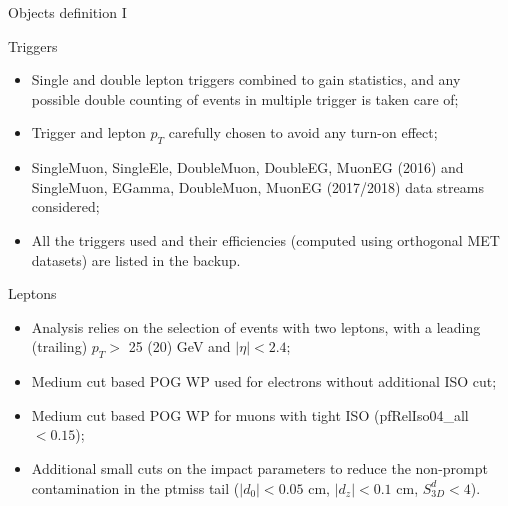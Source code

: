 \documentclass[8pt]{beamer}
\begin{document}
\begin{frame}{Objects definition I}
\justifying

\vspace{5pt} \begin{block}{\centering Triggers}\end{block} \vspace{-6pt}
\begin{itemize}
\justifying
\item \alert{Single and double lepton triggers} combined to gain statistics, and any possible double counting of events in multiple trigger is taken care of;
\item Trigger and lepton $p_T$ carefully chosen to avoid any turn-on effect;
\item SingleMuon, SingleEle, DoubleMuon, DoubleEG, MuonEG (2016) and SingleMuon, EGamma, DoubleMuon, MuonEG (2017/2018) data streams considered;
\item All the triggers used and their efficiencies (computed using orthogonal MET datasets) are listed in the backup.
\end{itemize} \vfill

\begin{block}{\centering Leptons}\end{block} \vspace{-6pt}
\begin{itemize}
\justifying
\item Analysis relies on the selection of events with two leptons, with a leading (trailing) $p_T >$ 25 (20) GeV and $|\eta| < 2.4$;
\item \alert{Medium cut based} POG WP used for electrons without additional ISO cut;
\item \alert{Medium cut based} POG WP for muons with tight ISO (pfRelIso04\_all $< 0.15$);
\item Additional small cuts on the impact parameters to reduce the non-prompt contamination in the ptmiss tail ($|d_0| < 0.05$ cm, $|d_z| < 0.1$ cm, $S_{3D}^d < 4$).
\end{itemize}
\end{frame}
\end{document}
